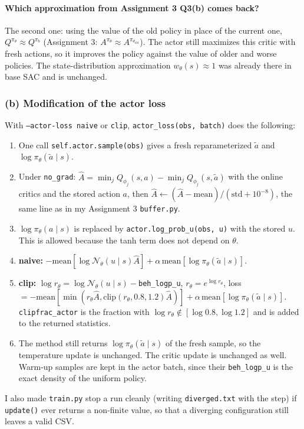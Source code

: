 \documentclass[11pt]{article}
\newcommand{\Ahat}{\hat{A}}
\newcommand{\code}[1]{\texttt{#1}}
\begin{document}
\paragraph{Which approximation from Assignment 3 Q3(b) comes back?}
The second one: using the value of the old policy in place of the current one,
$Q^{\pi_\theta}\approx Q^{\pi_b}$ (Assignment 3: $A^{\pi_\theta}\approx A^{\pi_{\theta_{\mathrm{old}}}}$).
The actor still maximizes this critic with fresh actions, so it improves the policy against the value of
older and worse policies. The state-distribution approximation $w_\theta(s)\approx1$ was already there in base SAC
and is unchanged.

\subsubsection*{(b) Modification of the actor loss}
With \code{--actor-loss naive} or \code{clip}, \code{actor\_loss(obs, batch)} does the following:
\begin{enumerate}[nosep]
  \item One call \code{self.actor.sample(obs)} gives a fresh reparameterized $\tilde a$ and $\log\pi_\theta(\tilde a\mid s)$.
  \item Under \code{no\_grad}: $\Ahat=\min_jQ_{\phi_j}(s,a)-\min_jQ_{\phi_j}(s,\tilde a)$ with the online critics and the
        stored action $a$, then $\Ahat\leftarrow(\Ahat-\mathrm{mean})/(\mathrm{std}+10^{-8})$, the same
        line as in my Assignment 3 \code{buffer.py}.
  \item $\log\pi_\theta(a\mid s)$ is replaced by \code{actor.log\_prob\_u(obs, u)} with the stored $u$.
        This is allowed because the tanh term does not depend on $\theta$.
  \item \textbf{naive:} $-\mathrm{mean}[\log\mathcal N_\theta(u\mid s)\Ahat]+\alpha\,\mathrm{mean}[\log\pi_\theta(\tilde a\mid s)]$.
  \item \textbf{clip:} $\log r_\theta=\log\mathcal N_\theta(u\mid s)-$\code{beh\_logp\_u}, $r_\theta=e^{\log r_\theta}$,
        loss $=-\mathrm{mean}[\min(r_\theta\Ahat,\mathrm{clip}(r_\theta,0.8,1.2)\Ahat)]+\alpha\,\mathrm{mean}[\log\pi_\theta(\tilde a\mid s)]$.
        \code{clipfrac\_actor} is the fraction with $\log r_\theta\notin[\log0.8,\log1.2]$ and is added to the
        returned statistics.
  \item The method still returns $\log\pi_\theta(\tilde a\mid s)$ of the fresh sample, so the temperature
        update is unchanged. The critic update is unchanged as well. Warm-up samples are kept in the actor batch,
        since their \code{beh\_logp\_u} is the exact density of the uniform policy.
\end{enumerate}
I also made \code{train.py} stop a run cleanly (writing \code{diverged.txt} with the step) if
\code{update()} ever returns a non-finite value, so that a diverging configuration still leaves a valid CSV.
\end{document}
